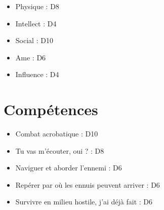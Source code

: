 \documentclass{Tamriel}
\begin{document}
\begin{multicols*}{2}
        \begin{itemize}
        \item Physique : D8
        \item Intellect : D4
        \item Social : D10
        \item Ame : D6
        \item Influence : D4
        \end{itemize}

        \section*{Compétences}

        \begin{itemize}
        \item Combat acrobatique : D10
        \item Tu vas m'écouter, oui ? : D8
        \item Naviguer et aborder l'ennemi : D6
        \item Repérer par où les ennuis peuvent arriver : D6
        \item Survivre en milieu hostile, j'ai déjà fait : D6
        \end{itemize}

        
\end{multicols*}
\end{document}
